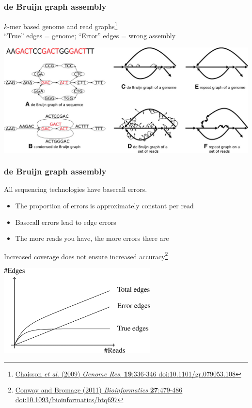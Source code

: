 \begin{frame}
  \frametitle{de Bruijn graph assembly}
  $k$-mer based genome and read graphs\footnote{\tiny{\href{http://dx.doi.org/10.1101/gr.079053.108}{Chaisson \textit{et al}. (2009) \textit{Genome Res.} \textbf{19}:336-346 doi:10.1101/gr.079053.108}}}\\
  ``True'' edges = genome; ``Error'' edges = wrong assembly
  \begin{center}
    \includegraphics[width=1\textwidth]{images/de_bruijn_repeats}
  \end{center}  
\end{frame}

\begin{frame}
  \frametitle{de Bruijn graph assembly}
  All sequencing technologies have basecall errors.
  \begin{itemize}
    \item The proportion of errors is approximately constant per read
    \item Basecall errors lead to edge errors
    \item The more reads you have, the more errors there are
  \end{itemize}
  Increased coverage does not ensure increased accuracy\footnote{\tiny{\href{http://dx.doi.org/10.1093/bioinformatics/btq697}{Conway and Bromage (2011) \textit{Bioinformatics} \textbf{27}:479-486 doi:10.1093/bioinformatics/btq697}}}
  \begin{center}
    \includegraphics[width=0.6\textwidth]{images/de_bruijn_errors}
  \end{center}   
\end{frame}

